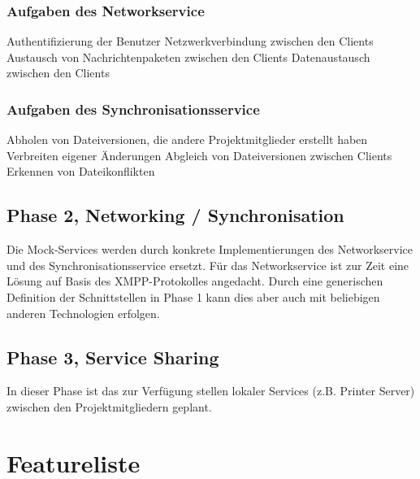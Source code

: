 \subsubsection{Aufgaben des Networkservice}
Authentifizierung der Benutzer
Netzwerkverbindung zwischen den Clients
Austausch von Nachrichtenpaketen zwischen den Clients
Datenaustausch zwischen den Clients

\subsubsection{Aufgaben des Synchronisationsservice}
Abholen von Dateiversionen, die andere Projektmitglieder erstellt haben
Verbreiten eigener Änderungen
Abgleich von Dateiversionen zwischen Clients
Erkennen von Dateikonflikten
\subsection{Phase 2, Networking / Synchronisation}
Die Mock-Services werden durch konkrete  Implementierungen des Networkservice und des Synchronisationsservice ersetzt. Für das Networkservice ist zur Zeit eine Lösung auf Basis des XMPP-Protokolles angedacht. Durch eine generischen Definition der Schnittstellen in Phase 1 kann dies aber auch mit beliebigen anderen Technologien erfolgen.
\subsection{Phase 3, Service Sharing}
In dieser Phase ist das zur Verfügung stellen lokaler Services (z.B. Printer Server) zwischen den Projektmitgliedern geplant.

\section{Featureliste}

